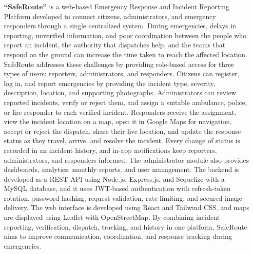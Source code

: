 \documentclass[a4paper,12pt]{report}
\begin{document}
	\textbf{``SafeRoute''} is a web-based Emergency Response and Incident Reporting Platform developed to connect citizens, administrators, and emergency responders through a single centralized system. During emergencies, delays in reporting, unverified information, and poor coordination between the people who report an incident, the authority that dispatches help, and the teams that respond on the ground can increase the time taken to reach the affected location. SafeRoute addresses these challenges by providing role-based access for three types of users: reporters, administrators, and responders. Citizens can register, log in, and report emergencies by providing the incident type, severity, description, location, and supporting photographs. Administrators can review reported incidents, verify or reject them, and assign a suitable ambulance, police, or fire responder to each verified incident. Responders receive the assignment, view the incident location on a map, open it in Google Maps for navigation, accept or reject the dispatch, share their live location, and update the response status as they travel, arrive, and resolve the incident. Every change of status is recorded in an incident history, and in-app notifications keep reporters, administrators, and responders informed. The administrator module also provides dashboards, analytics, monthly reports, and user management. The backend is developed as a REST API using Node.js, Express.js, and Sequelize with a MySQL database, and it uses JWT-based authentication with refresh-token rotation, password hashing, request validation, rate limiting, and secured image delivery. The web interface is developed using React and Tailwind CSS, and maps are displayed using Leaflet with OpenStreetMap. By combining incident reporting, verification, dispatch, tracking, and history in one platform, SafeRoute aims to improve communication, coordination, and response tracking during emergencies.
	
	\clearpage
	
	\tableofcontents
	\newpage
	
	\listoffigures
	\newpage
	
	\listoftables
	
\end{document}
